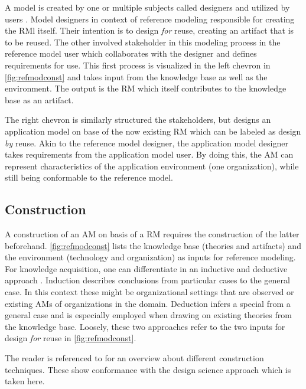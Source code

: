 		A model is created by one or multiple subjects called designers and utilized by users \citep{becker2004handelsinformationssysteme}. Model designers in context of reference modeling responsible for creating the \acrshort{RM}l itself. Their intention is to design \textit{for} reuse, \ie creating an artifact that is to be reused. The other involved stakeholder in this modeling process in the reference model user which collaborates with the designer and defines requirements for use. This first process is visualized in the left chevron in \Fig \ref{fig:refmodconst} and takes input from the knowledge base as well as the environment. The output is the  \acrshort{RM} which itself contributes to the knowledge base as an artifact. 
		
		The right chevron is similarly structured \wrt the stakeholders, but designs an application model on base of the now existing \acrshort{RM} which can be labeled as design \textit{by} reuse. Akin to the reference model designer, the application model designer takes requirements from the application model user. By doing this, the  \acrshort{AM} can represent characteristics of the application environment (\ie one organization), while still being conformable to the reference model. 
		
		\subsection{Construction}
		A construction of an \acrshort{AM} on basis of a \acrshort{RM} requires the construction of the latter beforehand. 
		\Fig \ref{fig:refmodconst} lists the knowledge base (theories and artifacts) and the environment (technology and organization) as inputs for reference modeling. For knowledge acquisition, one can differentiate in an inductive and deductive approach \citep{thomas2006mang}. Induction describes conclusions from particular cases to the general case. In this context these might be organizational settings that are observed or existing \acrshort{AM}s of organizations in the domain. Deduction infers a special from a general case and is especially employed when drawing on existing theories from the knowledge base. Loosely, these two approaches refer to the two inputs for design \textit{for} reuse in \Fig \ref{fig:refmodconst}. 
		
		The reader is referenced to \cite{Fettke2014meth} for an overview about different construction techniques. These show conformance with the design science approach \citep[]{Puster2015} which is taken here. 
		
